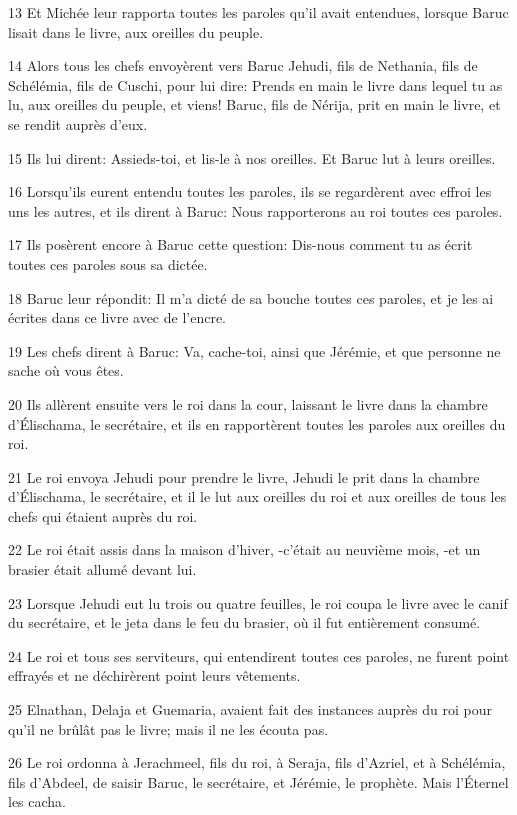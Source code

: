 \par 13 Et Michée leur rapporta toutes les paroles qu'il avait entendues, lorsque Baruc lisait dans le livre, aux oreilles du peuple.
\par 14 Alors tous les chefs envoyèrent vers Baruc Jehudi, fils de Nethania, fils de Schélémia, fils de Cuschi, pour lui dire: Prends en main le livre dans lequel tu as lu, aux oreilles du peuple, et viens! Baruc, fils de Nérija, prit en main le livre, et se rendit auprès d'eux.
\par 15 Ils lui dirent: Assieds-toi, et lis-le à nos oreilles. Et Baruc lut à leurs oreilles.
\par 16 Lorsqu'ils eurent entendu toutes les paroles, ils se regardèrent avec effroi les uns les autres, et ils dirent à Baruc: Nous rapporterons au roi toutes ces paroles.
\par 17 Ils posèrent encore à Baruc cette question: Dis-nous comment tu as écrit toutes ces paroles sous sa dictée.
\par 18 Baruc leur répondit: Il m'a dicté de sa bouche toutes ces paroles, et je les ai écrites dans ce livre avec de l'encre.
\par 19 Les chefs dirent à Baruc: Va, cache-toi, ainsi que Jérémie, et que personne ne sache où vous êtes.
\par 20 Ils allèrent ensuite vers le roi dans la cour, laissant le livre dans la chambre d'Élischama, le secrétaire, et ils en rapportèrent toutes les paroles aux oreilles du roi.
\par 21 Le roi envoya Jehudi pour prendre le livre, Jehudi le prit dans la chambre d'Élischama, le secrétaire, et il le lut aux oreilles du roi et aux oreilles de tous les chefs qui étaient auprès du roi.
\par 22 Le roi était assis dans la maison d'hiver, -c'était au neuvième mois, -et un brasier était allumé devant lui.
\par 23 Lorsque Jehudi eut lu trois ou quatre feuilles, le roi coupa le livre avec le canif du secrétaire, et le jeta dans le feu du brasier, où il fut entièrement consumé.
\par 24 Le roi et tous ses serviteurs, qui entendirent toutes ces paroles, ne furent point effrayés et ne déchirèrent point leurs vêtements.
\par 25 Elnathan, Delaja et Guemaria, avaient fait des instances auprès du roi pour qu'il ne brûlât pas le livre; mais il ne les écouta pas.
\par 26 Le roi ordonna à Jerachmeel, fils du roi, à Seraja, fils d'Azriel, et à Schélémia, fils d'Abdeel, de saisir Baruc, le secrétaire, et Jérémie, le prophète. Mais l'Éternel les cacha.
